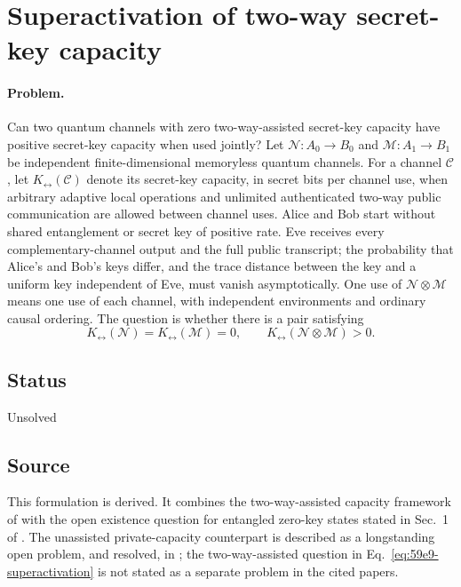 \section{Superactivation of two-way secret-key capacity}
\label{sec:op_59e9ede6e282a917}

\paragraph{Problem.}
Can two quantum channels with zero two-way-assisted secret-key capacity
have positive secret-key capacity when used jointly?  Let
$\mathcal N:A_0\to B_0$ and $\mathcal M:A_1\to B_1$ be independent
finite-dimensional memoryless quantum channels.  For a channel $\mathcal C$,
let $K_{\leftrightarrow}(\mathcal C)$ denote its secret-key capacity, in secret
bits per channel use, when arbitrary adaptive local operations and unlimited
authenticated two-way public communication are allowed between channel uses.
Alice and Bob start without shared entanglement or secret key of positive
rate.  Eve receives every complementary-channel output and the full public
transcript; the probability that Alice's and Bob's keys differ, and the trace
distance between the key and a uniform key independent of Eve, must vanish
asymptotically.  One use of $\mathcal N\otimes\mathcal M$ means one use of
each channel, with independent environments and ordinary causal ordering.  The
question is whether there is a pair satisfying
\begin{equation}
  K_{\leftrightarrow}(\mathcal N)=K_{\leftrightarrow}(\mathcal M)=0,
  \qquad
  K_{\leftrightarrow}(\mathcal N\otimes\mathcal M)>0.
  \label{eq:59e9-superactivation}
\end{equation}

\subsection*{Status}

Unsolved

\subsection*{Source}

This formulation is derived.  It combines the two-way-assisted capacity
framework of  with the open existence
question for entangled zero-key states stated in Sec.~1 of
.  The unassisted private-capacity
counterpart is described as a longstanding open problem, and resolved, in
; the two-way-assisted question in
Eq.~\eqref{eq:59e9-superactivation} is not stated as a separate problem in
the cited papers.

